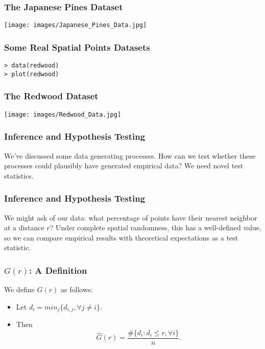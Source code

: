 \documentclass{beamer}
\begin{document}
\begin{frame}[fragile]
	\frametitle{The Japanese Pines Dataset}

	\begin{center}
		\texttt{[image: images/Japanese\_Pines\_Data.jpg]}
	\end{center}
\end{frame}

\begin{frame}[fragile]
	\frametitle{Some Real Spatial Points Datasets}
	\begin{verbatim}
> data(redwood)
> plot(redwood)
	\end{verbatim}
\end{frame}

\begin{frame}[fragile]
	\frametitle{The Redwood Dataset}

	\begin{center}
		\texttt{[image: images/Redwood\_Data.jpg]}
	\end{center}
\end{frame}

\begin{frame}[fragile]
	\frametitle{Inference and Hypothesis Testing}
	
	We've discussed some data generating processes. How can we test whether these processes could plausibly have generated empirical data? We need novel test statistics.
\end{frame}

\begin{frame}[fragile]
	\frametitle{Inference and Hypothesis Testing}

	We might ask of our data: what percentage of points have their nearest neighbor at a distance $r$? Under complete spatial randomness, this has a well-defined value, so we can compare empirical results with theoretical expectations as a test statistic.
\end{frame}

\begin{frame}[fragile]
	\frametitle{$G(r)$: A Definition}
	
	We define $G(r)$ as follows:
	\begin{itemize}
		\item<1->{Let $d_i = min_j \{d_{i, j}, \forall j \neq i\}$.}
		\item<2->{
			Then 
			\[
				\hat{G}(r) = \frac{\#\{d_i : d_i \leq r, \forall i\}}{n}.
			\]}
	\end{itemize}
\end{frame}
\end{document}
